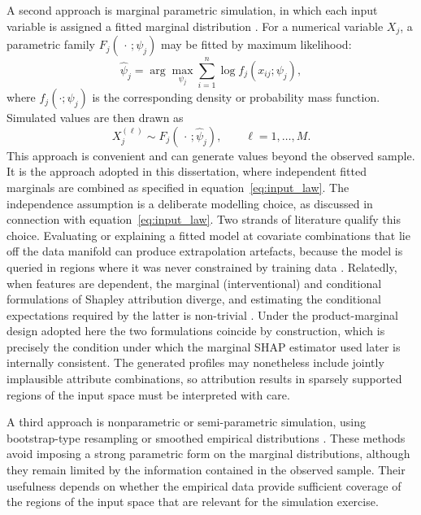 \noindent
A second approach is marginal parametric simulation, in which each input
variable is assigned a fitted marginal distribution
\citep{rubinstein2016simulation,glasserman2004monte}. For a numerical variable
\(X_j\), a parametric family \(F_j(\,\cdot\,;\psi_j)\) may be fitted by maximum
likelihood:
\begin{equation}
\label{eq:mle_marginal}
    \widehat{\psi}_j
    =
    \arg\max_{\psi_j}
    \sum_{i=1}^{n}
    \log f_j(x_{ij};\psi_j),
\end{equation}
where \(f_j(\cdot;\psi_j)\) is the corresponding density or probability mass
function. Simulated values are then drawn as
\begin{equation}
\label{eq:marginal_draw}
    X_j^{(\ell)}
    \sim
    F_j(\,\cdot\,;\widehat{\psi}_j),
    \qquad
    \ell=1,\ldots,M.
\end{equation}
This approach is convenient and can generate values beyond the observed sample.
It is the approach adopted in this dissertation, where independent fitted
marginals are combined as specified in equation~\eqref{eq:input_law}. The
independence assumption is a deliberate modelling choice, as discussed in
connection with equation~\eqref{eq:input_law}. Two strands of literature
qualify this choice. Evaluating or explaining a fitted model at covariate
combinations that lie off the data manifold can produce extrapolation
artefacts, because the model is queried in regions where it was never
constrained by training data \citep{hooker2021unrestricted}. Relatedly, when
features are dependent, the marginal (interventional) and conditional
formulations of Shapley attribution diverge, and estimating the conditional
expectations required by the latter is non-trivial
\citep{aas2021explaining, janzing2020feature}. Under the product-marginal
design adopted here the two formulations coincide by construction, which is
precisely the condition under which the marginal SHAP estimator used
later is internally consistent. The generated profiles may nonetheless
include jointly implausible attribute combinations, so attribution results
in sparsely supported regions of the input space must be interpreted with
care.

\noindent
A third approach is nonparametric or semi-parametric simulation, using
bootstrap-type resampling or smoothed empirical distributions
\citep{efron1993bootstrap}. These methods avoid imposing a strong parametric
form on the marginal distributions, although they remain limited by the
information contained in the observed sample. Their usefulness depends on
whether the empirical data provide sufficient coverage of the regions of the
input space that are relevant for the simulation exercise.


